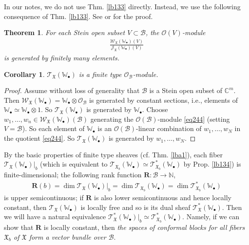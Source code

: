 \documentclass[11pt,b5paper,notitlepage]{article}
\theoremstyle{definition}
\theoremstyle{plain}
\newtheorem{thm}[df]{Theorem}
\newtheorem{co}[df]{Corollary}
\newcommand{\fk}{\mathfrak}
\newcommand{\mc}{\mathcal}
\newcommand{\scr}{\mathscr}
\newcommand{\blt}{\bullet}
\newcommand{\Wbb}{\mathbb W}
\newcommand{\Cbb}{\mathbb C}
\newcommand{\Nbb}{\mathbb N}
\newcommand{\Rbf}{\mathbf R}
\numberwithin{equation}{section}
\begin{document}
In our notes, we do not use Thm. \ref{lb133} directly. Instead, we use the following consequence of Thm. \ref{lb133}. See \cite[Sec. 7]{Gui20} or \cite[Sec. 3.7]{Gui} for the proof.

\begin{thm}\label{lb138}
For each Stein open subset $V\subset\mc B$, the $\scr O(V)$-module
\begin{align}
\frac{\scr W_{\fk X}(\Wbb_\blt)(V)}{\scr J_{\fk X}(\Wbb_\blt)(V)}\label{eq244}
\end{align}
is generated by finitely many elements.
\end{thm}

\begin{co}
$\scr T_{\fk X}(\Wbb_\blt)$ is a finite type $\scr O_{\mc B}$-module.
\end{co}

\begin{proof}
Assume without loss of generality that $\mc B$ is a Stein open subset of $\Cbb^m$. Then $\scr W_{\fk X}(\Wbb_\blt)=\Wbb_\blt\otimes\scr O_{\mc B}$ is generated by constant sections, i.e., elements of $\Wbb_\blt\simeq\Wbb_\blt\otimes 1$. So $\scr T_{\fk X}(\Wbb_\blt)$ is generated by $\Wbb_\blt$. Choose $w_1,\dots,w_n\in \scr W_{\fk X}(\Wbb_\blt)(\mc B)$ generating the $\scr O({\mc B})$-module \eqref{eq244} (setting $V=\mc B$). So each element of $\Wbb_\blt$ is an $\scr O(\mc B)$-linear combination of $w_1,\dots,w_N$ in the quotient \eqref{eq244}. So $\scr T_{\fk X}(\Wbb_\blt)$ is generated by $w_1,\dots,w_N$.
\end{proof}


By the basic properties of finite type sheaves (cf. Thm. \ref{lba1}), each fiber $\scr T_{\fk X}(\Wbb_\blt)|_b$ (which is equivalent to $\scr T_{\fk X_b}(\Wbb_\blt)\simeq\scr T_{\fk X_b}^*(\Wbb_\blt)$ by Prop. \ref{lb134}) is finite-dimensional; the following rank function $\Rbf:\mc B\rightarrow\Nbb$,
\begin{align}
\Rbf(b)=\dim \scr T_{\fk X}(\Wbb_\blt)|_b=\dim\scr T_{\fk X_b}(\Wbb_\blt)=\dim\scr T_{\fk X_b}^*(\Wbb_\blt) \label{eq246}
\end{align}
is upper semicontinuous; if $\Rbf$ is also lower semicontinuous and hence locally constant, then $\scr T_{\fk X}(\Wbb_\blt)$ is locally free and so is its dual sheaf $\scr T_{\fk X}^*(\Wbb_\blt)$. Then we will have a natural equivalence $\scr T_{\fk X}^*(\Wbb_\blt)|_b\simeq\scr T_{\fk X_b}^*(\Wbb_\blt)$. Namely, if we can show that $\Rbf$ is locally constant, then \emph{the spaces of conformal blocks for all fibers $\fk X_b$ of $\fk X$ form a vector bundle over $\mc B$}.
\end{document}
